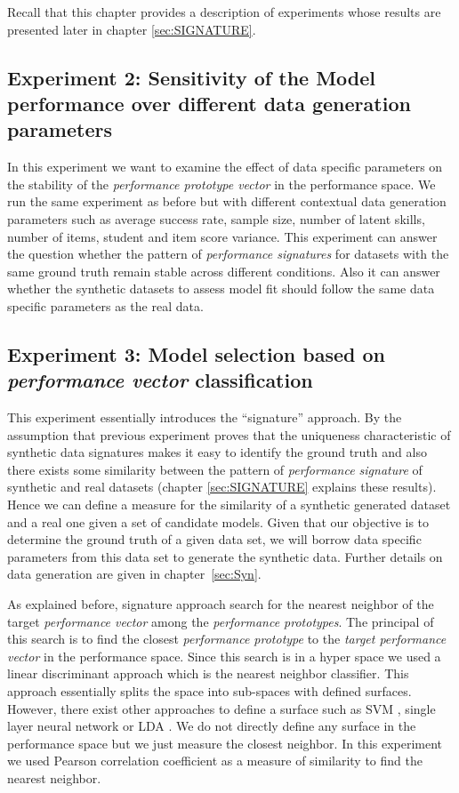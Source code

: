Recall that this chapter provides a description of experiments whose results are presented later in chapter \ref{sec:SIGNATURE}.

\subsection{Experiment 2: Sensitivity of the Model performance over different data generation parameters}
\label{Sensitive}

In this experiment we want to examine the effect of data specific parameters on the stability of the \textit{performance prototype vector} in the performance space. We run the same experiment as before but with different contextual data generation parameters such as average success rate, sample size, number of latent skills, number of items, student and item score variance. This experiment can answer the question whether the pattern of \textit{performance signatures} for datasets with the same ground truth remain stable across different conditions. Also it can answer whether the synthetic datasets to assess model fit should follow the same data specific parameters as the real data.


\subsection{Experiment 3: Model selection based on \textit{performance vector} classification}
\label{Sigapproach-measure}
This experiment essentially introduces the ``signature'' approach. By the assumption that previous experiment proves that the uniqueness characteristic of synthetic data signatures makes it easy to identify the ground truth and also there exists some similarity between the pattern of \textit{performance signature} of synthetic and real datasets (chapter \ref{sec:SIGNATURE} explains these results). Hence we can define a measure for the similarity of a synthetic generated dataset and a real one given a set of candidate models. Given that our objective is to determine the ground truth of a given data set, we will borrow data specific parameters from this data set to generate the synthetic data.  Further details on data generation are given in chapter~\ref{sec:Syn}. 

As explained before, signature approach search for the nearest neighbor of the target \textit{performance vector} among the \textit{performance prototypes}. The principal of this search is to find the closest \textit{performance prototype} to the \textit{target performance vector} in the performance space. Since this search is in a hyper space we used a linear discriminant approach which is the nearest neighbor classifier. This approach essentially splits the space into sub-spaces with defined surfaces. However, there exist other approaches to define a surface such as SVM \citep{cortes1995support,suykens2002least}, single layer neural network \citep{lippmann1987introduction} or LDA \citep{mclachlan2004discriminant,scholkopft1999fisher}. We do not directly define any surface in the performance space but we just measure the closest neighbor. In this experiment we used Pearson correlation coefficient as a measure of similarity to find the nearest neighbor.

